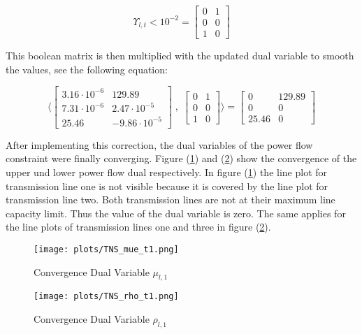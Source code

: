 \begin{equation}
	\Upsilon_{l,t} < 10^{-2} = \begin{bmatrix}
			0 & 1 \\
			0 & 0 \\
			1 & 0
		\end{bmatrix}
\end{equation}

 This boolean matrix is then multiplied with the updated dual variable to smooth the values, see the following equation:
 
 \begin{equation}
	 \langle \begin{bmatrix}
			3.16 \cdot 10^{-6} & 129.89 \\
			7.31 \cdot 10^{-6} & 2.47 \cdot 10^{-5} \\
			25.46 & -9.86 \cdot 10^{-5}
	\end{bmatrix} \; , \; \begin{bmatrix}
			0 & 1 \\
			0 & 0 \\
			1 & 0
		\end{bmatrix} \rangle = \begin{bmatrix}
			0 & 129.89 \\
			0 & 0 \\
			25.46 & 0
		\end{bmatrix}
\end{equation}
 
 After implementing this correction, the dual variables of the power flow constraint were finally converging. Figure (\ref{fig:conv-mue}) and (\ref{fig:conv-rho}) show the convergence of the upper und lower power flow dual respectively. In figure (\ref{fig:conv-mue}) the line plot for transmission line one is not visible because it is covered by the line plot for transmission line two. Both transmission lines are not at their maximum line capacity limit. Thus the value of the dual variable is zero. The same applies for the line plots of transmission lines one and three in figure (\ref{fig:conv-rho}).

\begin{figure}[h!]
	\centering
	\texttt{[image: plots/TNS\_mue\_t1.png]}
	\caption{Convergence Dual Variable $\mu_{l,1}$}
	\label{fig:conv-mue}
\end{figure}

\begin{figure}[h!]
	\centering
	\texttt{[image: plots/TNS\_rho\_t1.png]}
	\caption{Convergence Dual Variable $\rho_{l,1}$}
	\label{fig:conv-rho}
\end{figure}


